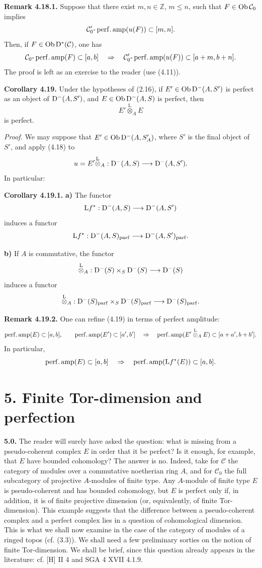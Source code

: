 \documentclass[11pt]{article}
\begin{document}
\textbf{Remark 4.18.1.} Suppose that there exist \(m,n\in\mathbb Z\), \(m\leq n\), such that \(F\in\operatorname{Ob}\mathcal C_0\) implies
\[
  \mathcal C'_0\text{-}\operatorname{perf.amp}(u(F))\subset[m,n].
\]
Then, if \(F\in\operatorname{Ob}\mathrm D^*(\mathcal C)\), one has
\[
  \mathcal C_0\text{-}\operatorname{perf.amp}(F)
  \subset [a,b]
  \quad\Rightarrow\quad
  \mathcal C'_0\text{-}\operatorname{perf.amp}(u(F))
  \subset [a+m,b+n].
\]
The proof is left as an exercise to the reader (use (4.11)).

\textbf{Corollary 4.19.} Under the hypotheses of (2.16), if \(E'\in\operatorname{Ob}\mathrm D^-(A,S')\) is perfect as an object of \(\mathrm D^-(A,S')\), and \(E\in\operatorname{Ob}\mathrm D^-(A,S)\) is perfect, then
\[
  E'\overset{\mathrm L}{\otimes}_A E
\]
is perfect.

\emph{Proof.} We may suppose that \(E'\in\operatorname{Ob}\mathrm D^-(A,S'_A)\), where \(S'\) is the final object of \(S'\), and apply (4.18) to
\[
  u=E'\overset{\mathrm L}{\otimes}_A:
  \mathrm D^-(A,S)\longrightarrow \mathrm D^-(A,S').
\]
In particular:

\textbf{Corollary 4.19.1.} \textbf{a)} The functor
\[
  \mathrm L f^*:\mathrm D^-(A,S)\longrightarrow \mathrm D^-(A,S')
\]
induces a functor
\[
  \mathrm L f^*:\mathrm D^-(A,S)_{\mathrm{parf}}
  \longrightarrow
  \mathrm D^-(A,S')_{\mathrm{parf}}.
\]

\textbf{b)} If \(A\) is commutative, the functor
\[
  \overset{\mathrm L}{\otimes}_A:
  \mathrm D^-(S)\times_S\mathrm D^-(S)
  \longrightarrow \mathrm D^-(S)
\]
induces a functor
\[
  \overset{\mathrm L}{\otimes}_A:
  \mathrm D^-(S)_{\mathrm{parf}}\times_S\mathrm D^-(S)_{\mathrm{parf}}
  \longrightarrow \mathrm D^-(S)_{\mathrm{parf}}.
\]

\textbf{Remark 4.19.2.} One can refine (4.19) in terms of perfect amplitude:
\[
  \operatorname{perf.amp}(E)\subset[a,b],\qquad
  \operatorname{perf.amp}(E')\subset[a',b']
  \quad\Rightarrow\quad
  \operatorname{perf.amp}(E'\overset{\mathrm L}{\otimes}_A E)\subset[a+a',b+b'].
\]
In particular,
\[
  \operatorname{perf.amp}(E)\subset[a,b]
  \quad\Rightarrow\quad
  \operatorname{perf.amp}(\mathrm L f^*(E))\subset[a,b].
\]

\section*{5. Finite Tor-dimension and perfection}

\textbf{5.0.} The reader will surely have asked the question: what is missing from a pseudo-coherent complex \(E\) in order that it be perfect? Is it enough, for example, that \(E\) have bounded cohomology? The answer is no. Indeed, take for \(\mathcal C\) the category of modules over a commutative noetherian ring \(A\), and for \(\mathcal C_0\) the full subcategory of projective \(A\)-modules of finite type. Any \(A\)-module of finite type \(E\) is pseudo-coherent and has bounded cohomology, but \(E\) is perfect only if, in addition, it is of finite projective dimension (or, equivalently, of finite Tor-dimension). This example suggests that the difference between a pseudo-coherent complex and a perfect complex lies in a question of cohomological dimension. This is what we shall now examine in the case of the category of modules of a ringed topos (cf. (3.3)). We shall need a few preliminary sorties on the notion of finite Tor-dimension. We shall be brief, since this question already appears in the literature: cf. [H] II 4 and SGA 4 XVII 4.1.9.
\end{document}
